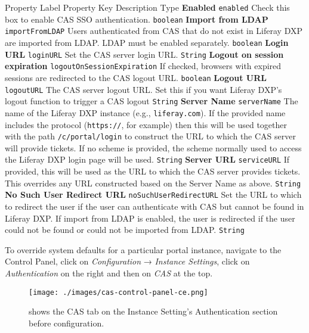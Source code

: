 Property Label \textbar{} Property Key \textbar{} Description \textbar{}
Type \textbf{Enabled} \textbar{} \texttt{enabled} \textbar{} Check this
box to enable CAS SSO authentication. \textbar{} \texttt{boolean}
\textbf{Import from LDAP} \textbar{} \texttt{importFromLDAP} \textbar{}
Users authenticated from CAS that do not exist in Liferay DXP are
imported from LDAP. LDAP must be enabled separately. \textbar{}
\texttt{boolean} \textbf{Login URL} \textbar{} \texttt{loginURL}
\textbar{} Set the CAS server login URL. \textbar{} \texttt{String}
\textbf{Logout on session expiration} \textbar{}
\texttt{logoutOnSessionExpiration} \textbar{} If checked, browsers with
expired sessions are redirected to the CAS logout URL. \textbar{}
\texttt{boolean} \textbf{Logout URL} \textbar{} \texttt{logoutURL}
\textbar{} The CAS server logout URL. Set this if you want Liferay DXP's
logout function to trigger a CAS logout \textbar{} \texttt{String}
\textbf{Server Name} \textbar{} \texttt{serverName} \textbar{} The name
of the Liferay DXP instance (e.g., \texttt{liferay.com}). If the
provided name includes the protocol (\texttt{https://}, for example)
then this will be used together with the path \texttt{/c/portal/login}
to construct the URL to which the CAS server will provide tickets. If no
scheme is provided, the scheme normally used to access the Liferay DXP
login page will be used. \textbar{} \texttt{String} \textbf{Server URL}
\textbar{} \texttt{serviceURL} \textbar{} If provided, this will be used
as the URL to which the CAS server provides tickets. This overrides any
URL constructed based on the Server Name as above. \textbar{}
\texttt{String} \textbf{No Such User Redirect URL} \textbar{}
\texttt{noSuchUserRedirectURL} \textbar{} Set the URL to which to
redirect the user if the user can authenticate with CAS but cannot be
found in Liferay DXP. If import from LDAP is enabled, the user is
redirected if the user could not be found or could not be imported from
LDAP. \textbar{} \texttt{String}

To override system defaults for a particular portal instance, navigate
to the Control Panel, click on \emph{Configuration} → \emph{Instance
Settings}, click on \emph{Authentication} on the right and then on
\emph{CAS} at the top.

\begin{figure}
\centering
\texttt{[image: ./images/cas-control-panel-ce.png]}
\caption{shows the CAS tab on the Instance Setting's Authentication
section before configuration.}
\end{figure}

